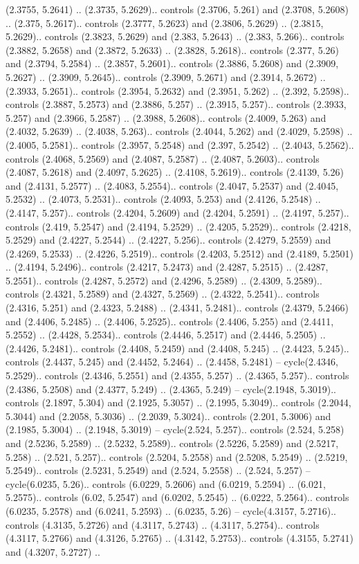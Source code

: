 (2.3755, 5.2641) .. (2.3735, 5.2629).. controls (2.3706, 5.261) and (2.3708, 5.2608) .. (2.375, 5.2617).. controls (2.3777, 5.2623) and (2.3806, 5.2629) .. (2.3815, 5.2629).. controls (2.3823, 5.2629) and (2.383, 5.2643) .. (2.383, 5.266).. controls (2.3882, 5.2658) and (2.3872, 5.2633) .. (2.3828, 5.2618).. controls (2.377, 5.26) and (2.3794, 5.2584) .. (2.3857, 5.2601).. controls (2.3886, 5.2608) and (2.3909, 5.2627) .. (2.3909, 5.2645).. controls (2.3909, 5.2671) and (2.3914, 5.2672) .. (2.3933, 5.2651).. controls (2.3954, 5.2632) and (2.3951, 5.262) .. (2.392, 5.2598).. controls (2.3887, 5.2573) and (2.3886, 5.257) .. (2.3915, 5.257).. controls (2.3933, 5.257) and (2.3966, 5.2587) .. (2.3988, 5.2608).. controls (2.4009, 5.263) and (2.4032, 5.2639) .. (2.4038, 5.263).. controls (2.4044, 5.262) and (2.4029, 5.2598) .. (2.4005, 5.2581).. controls (2.3957, 5.2548) and (2.397, 5.2542) .. (2.4043, 5.2562).. controls (2.4068, 5.2569) and (2.4087, 5.2587) .. (2.4087, 5.2603).. controls (2.4087, 5.2618) and (2.4097, 5.2625) .. (2.4108, 5.2619).. controls (2.4139, 5.26) and (2.4131, 5.2577) .. (2.4083, 5.2554).. controls (2.4047, 5.2537) and (2.4045, 5.2532) .. (2.4073, 5.2531).. controls (2.4093, 5.253) and (2.4126, 5.2548) .. (2.4147, 5.257).. controls (2.4204, 5.2609) and (2.4204, 5.2591) .. (2.4197, 5.257).. controls (2.419, 5.2547) and (2.4194, 5.2529) .. (2.4205, 5.2529).. controls (2.4218, 5.2529) and (2.4227, 5.2544) .. (2.4227, 5.256).. controls (2.4279, 5.2559) and (2.4269, 5.2533) .. (2.4226, 5.2519).. controls (2.4203, 5.2512) and (2.4189, 5.2501) .. (2.4194, 5.2496).. controls (2.4217, 5.2473) and (2.4287, 5.2515) .. (2.4287, 5.2551).. controls (2.4287, 5.2572) and (2.4296, 5.2589) .. (2.4309, 5.2589).. controls (2.4321, 5.2589) and (2.4327, 5.2569) .. (2.4322, 5.2541).. controls (2.4316, 5.251) and (2.4323, 5.2488) .. (2.4341, 5.2481).. controls (2.4379, 5.2466) and (2.4406, 5.2485) .. (2.4406, 5.2525).. controls (2.4406, 5.255) and (2.4411, 5.2552) .. (2.4428, 5.2534).. controls (2.4446, 5.2517) and (2.4446, 5.2505) .. (2.4426, 5.2481).. controls (2.4408, 5.2459) and (2.4408, 5.245) .. (2.4423, 5.245).. controls (2.4437, 5.245) and (2.4452, 5.2464) .. (2.4458, 5.2481) -- cycle(2.4346, 5.2529).. controls (2.4346, 5.2551) and (2.4355, 5.257) .. (2.4365, 5.257).. controls (2.4386, 5.2508) and (2.4377, 5.249) .. (2.4365, 5.249) -- cycle(2.1948, 5.3019).. controls (2.1897, 5.304) and (2.1925, 5.3057) .. (2.1995, 5.3049).. controls (2.2044, 5.3044) and (2.2058, 5.3036) .. (2.2039, 5.3024).. controls (2.201, 5.3006) and (2.1985, 5.3004) .. (2.1948, 5.3019) -- cycle(2.524, 5.257).. controls (2.524, 5.258) and (2.5236, 5.2589) .. (2.5232, 5.2589).. controls (2.5226, 5.2589) and (2.5217, 5.258) .. (2.521, 5.257).. controls (2.5204, 5.2558) and (2.5208, 5.2549) .. (2.5219, 5.2549).. controls (2.5231, 5.2549) and (2.524, 5.2558) .. (2.524, 5.257) -- cycle(6.0235, 5.26).. controls (6.0229, 5.2606) and (6.0219, 5.2594) .. (6.021, 5.2575).. controls (6.02, 5.2547) and (6.0202, 5.2545) .. (6.0222, 5.2564).. controls (6.0235, 5.2578) and (6.0241, 5.2593) .. (6.0235, 5.26) -- cycle(4.3157, 5.2716).. controls (4.3135, 5.2726) and (4.3117, 5.2743) .. (4.3117, 5.2754).. controls (4.3117, 5.2766) and (4.3126, 5.2765) .. (4.3142, 5.2753).. controls (4.3155, 5.2741) and (4.3207, 5.2727) .. 